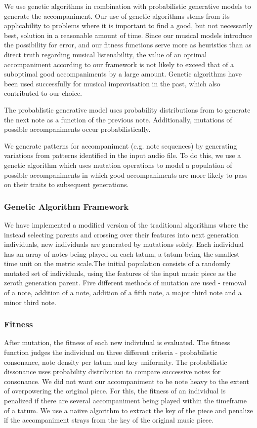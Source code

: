 \documentclass[11pt,conference,letterpaper]{IEEEtran}
\begin{document}
We use genetic algorithms in combination with probabilistic generative models to generate the accompaniment. Our use of genetic algorithms stems from its applicability to problems where it is important to find a good, but not necessarily best, solution in a reasonable amount of time. Since our musical models introduce the possibility for error, and our fitness functions serve more as heuristics than as direct truth regarding musical listenability, the value of an optimal accompaniment according to our framework is not likely to exceed that of a suboptimal good accompaniments by a large amount. Genetic algorithms have been used successfully for musical improvisation in the past, which also contributed to our choice.

The probablistic generative model uses probability distributions from \cite{tempereley2007music} to generate the next note as a function of the previous note. Additionally, mutations of possible accompaniments occur probabilistically.

We generate patterns for accompaniment (e.g. note sequences) by generating variations from patterns identified in the input audio file. To do this, we use a genetic algorithm which uses mutation operations to model a population of possible accompaniments in which good accompaniments are more likely to pass on their traits to subsequent generations.

\subsubsection{Genetic Algorithm Framework}
We have implemented a modified version of the traditional algorithms where the instead selecting parents and crossing over their features into next generation individuals, new individuals are generated by mutations solely. Each individual has an array of notes being played on each tatum, a tatum being the smallest time unit on the metric scale.The initial population consists of a randomly mutated set of individuals, using the features of the input music piece as the zeroth generation parent. Five different methods of mutation are used - removal of a note, addition of a note, addition of a fifth note, a major third note and a minor third note. 

\subsubsection{Fitness}
After mutation, the fitness of each new individual is evaluated. The fitness function judges the individual on three different criteria - probabilistic consonance, note density per tatum and key uniformity. The probabilistic dissonance uses probability distribution \cite{tempereley2007music} to compare successive notes for consonance. We did not want our accompaniment to be note heavy to the extent of overpowering the original piece. For this, the fitness of an individual is penalized if there are several accompaniment being played within the timeframe of a tatum. We use a naiive algorithm to extract the key of the piece and penalize if the accompaniment strays from the key of the original music piece.
\end{document}
